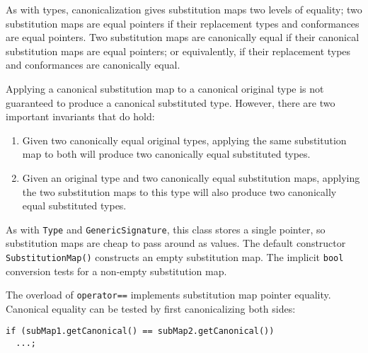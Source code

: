 \documentclass[../generics]{subfiles}
\begin{document}
As with types, canonicalization gives substitution maps two levels of equality; two substitution maps are equal pointers if their replacement types and conformances are equal pointers. Two substitution maps are canonically equal if their canonical substitution maps are equal pointers; or equivalently, if their replacement types and conformances are canonically equal.

Applying a canonical substitution map to a canonical original type is not guaranteed to produce a canonical substituted type. However, there are two important invariants that do hold:
\begin{enumerate}
\item Given two canonically equal original types, applying the same substitution map to both will produce two canonically equal substituted types.
\item Given an original type and two canonically equal substitution maps, applying the two substitution maps to this type will also produce two canonically equal substituted types.
\end{enumerate}

As with \texttt{Type} and \texttt{GenericSignature}, this class stores a single pointer, so substitution maps are cheap to pass around as values. The default constructor \texttt{SubstitutionMap()} constructs an empty substitution map. The implicit \texttt{bool} conversion tests for a non-empty substitution map.

The overload of \texttt{operator==} implements substitution map pointer equality. Canonical equality can be tested by first canonicalizing both sides:
\begin{Verbatim}
if (subMap1.getCanonical() == subMap2.getCanonical())
  ...;
\end{Verbatim}
\end{document}
